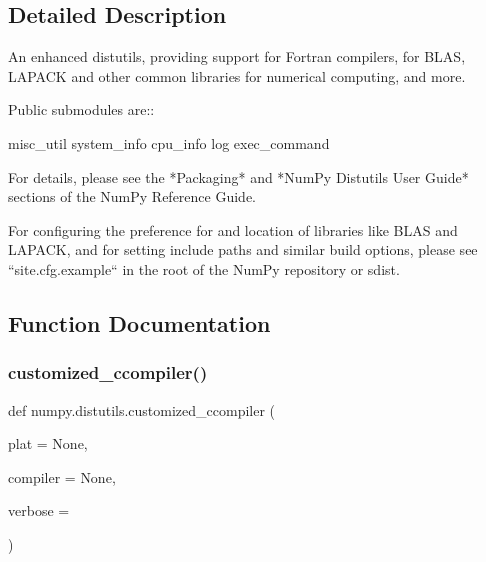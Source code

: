 \subsection{Detailed Description}
\begin{DoxyVerb}An enhanced distutils, providing support for Fortran compilers, for BLAS,
LAPACK and other common libraries for numerical computing, and more.

Public submodules are::

misc_util
system_info
cpu_info
log
exec_command

For details, please see the *Packaging* and *NumPy Distutils User Guide*
sections of the NumPy Reference Guide.

For configuring the preference for and location of libraries like BLAS and
LAPACK, and for setting include paths and similar build options, please see
``site.cfg.example`` in the root of the NumPy repository or sdist.\end{DoxyVerb}
 

\subsection{Function Documentation}
\mbox{\label{namespacenumpy_1_1distutils_a1bee492d455b35c6ca27a579ef52dcf3}} 
\subsubsection{\texorpdfstring{customized\+\_\+ccompiler()}{customized\_ccompiler()}}
{\footnotesize\ttfamily def numpy.\+distutils.\+customized\+\_\+ccompiler (\begin{DoxyParamCaption}\item[{}]{plat = {\ttfamily None},  }\item[{}]{compiler = {\ttfamily None},  }\item[{}]{verbose = {} }\end{DoxyParamCaption})}

\mbox{\label{namespacenumpy_1_1distutils_a945ab1b3b10166278586b04b5a002a83}} 
